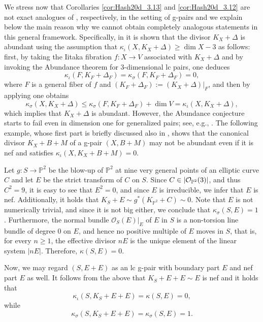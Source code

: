 	We stress now that Corollaries \ref{cor:Hash20d_3.13} and \ref{cor:Hash20d_3.12} are not exact analogues of \cite[Corollaries 3.13 and 3.12]{Hash20d}, respectively, in the setting of g-pairs and we explain below the main reason why we cannot obtain completely analogous statements in this general framework. Specifically, in \cite[Corollaries 3.12 and 3.13]{Hash20d} it is shown that the divisor $K_X+\Delta$ is abundant using the assumption that $ \kappa_\iota(X,K_X+\Delta)\geq \dim X-3 $ as follows: first, by taking the Iitaka fibration $f \colon X\to V$ associated with $K_X+\Delta$ and by invoking the Abundance theorem for 3-dimensional lc pairs, one deduces
	$$ \kappa_\iota(F,K_F+\Delta_F)=\kappa_\sigma(F,K_F+\Delta_F)=0 , $$
	where $F$ is a general fiber of $f$ and $(K_F+\Delta_F) :=(K_X+\Delta)|_F$, and then by applying \cite[Proposition V.2.7(9)]{Nak04} one obtains
	$$ \kappa_\sigma(X,K_X+\Delta) \leq \kappa_\sigma(F,K_F+\Delta_F)+\dim V = \kappa_\iota(X,K_X+\Delta) , $$
	which implies that $K_X+\Delta$ is abundant. However, the Abundance conjecture starts to fail even in dimension one for generalized pairs; see, e.g., \cite[Section 3]{BH14b}. The following example, whose first part is briefly discussed also in \cite[Section 2, Paragraph after Theorem 2.1]{Tot09}, shows that the canonical divisor $K_X+B+M$ of a g-pair $(X,B+M)$ may not be abundant even if it is nef and satisfies $\kappa_\iota(X,K_X+B+M)=0$.
	
	
	\begin{exa}
		Let $g \colon S \to \mathbb{P}^2$ be the blow-up of $\mathbb{P}^2$ at nine very general points of an elliptic curve $C $ and let $E$ be the strict transform of $C$ on $S$. Since $C \in |\mathcal{O}_{\mathbb{P}^2}(3)| $, and thus $C^2 = 9$, it is easy to see that $E^2 = 0$, and since $E$ is irreducible, we infer that $E$ is nef. Additionally, it holds that $K_S+E \sim g^* (K_{\mathbb{P}^2} + C) \sim 0$.
		Note that $E$ is not numerically trivial, and since it is not big either, we conclude that $\kappa_\sigma(S,E) = 1$. Furthermore, the normal bundle $\mathcal{O}_S(E)|_E$ of $E$ in $S$ is a non-torsion line bundle of degree $0$ on $E$, and hence no positive multiple of $E$ moves in $S$, that is, for every $n \geq 1$, the effective divisor $nE$ is the unique element of the linear system $ |nE|$. Therefore, $\kappa(S,E) = 0$. 
		
		Now, we may regard $(S,E+E)$ as an lc g-pair with boundary part $E$ and nef part $E$ as well. It follows from the above that $K_S + E + E \sim E $ is nef and it holds that
		$$ \kappa_\iota(S,K_S+E+E)=\kappa(S,E)=0 , $$
		while
		$$ \kappa_\sigma(S,K_S+E+E)=\kappa_\sigma(S,E)=1 . $$
	\end{exa}
	
